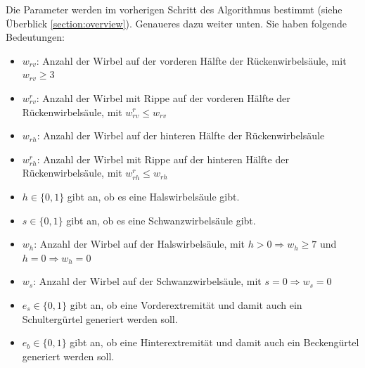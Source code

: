 Die Parameter werden im vorherigen Schritt des Algorithmus bestimmt (siehe Überblick \ref{section:overview}). Genaueres dazu weiter unten. Sie haben folgende Bedeutungen:
\begin{itemize}
 \item $w_{rv}$: Anzahl der Wirbel auf der vorderen Hälfte der Rückenwirbelsäule, mit $w_{rv} \geq 3$
 \item $w_{rv}^r$: Anzahl der Wirbel mit Rippe auf der vorderen Hälfte der Rückenwirbelsäule, mit $w_{rv}^r \leq w_{rv}$
 \item $w_{rh}$: Anzahl der Wirbel auf der hinteren Hälfte der Rückenwirbelsäule
 \item $w_{rh}^r$: Anzahl der Wirbel mit Rippe auf der hinteren Hälfte der Rückenwirbelsäule, mit $w_{rh}^r \leq w_{rh}$
 \item $h \in \{0,1\}$ gibt an, ob es eine Halswirbelsäule gibt.
 \item $s \in \{0,1\}$ gibt an, ob es eine Schwanzwirbelsäule gibt.
 \item $w_h$: Anzahl der Wirbel auf der Halswirbelsäule, mit $h > 0 \Rightarrow w_h \geq 7$ und \mbox{$h = 0 \Rightarrow w_h = 0$}
 \item $w_s$: Anzahl der Wirbel auf der Schwanzwirbelsäule, mit $s = 0 \Rightarrow w_s = 0$
 \item $e_s \in \{0, 1\}$ gibt an, ob eine Vorderextremität und damit auch ein Schultergürtel generiert werden soll.
 \item $e_b \in \{0, 1\}$ gibt an, ob eine Hinterextremität und damit auch ein Beckengürtel generiert werden soll.
\end{itemize}
\vspace{0.5cm}

